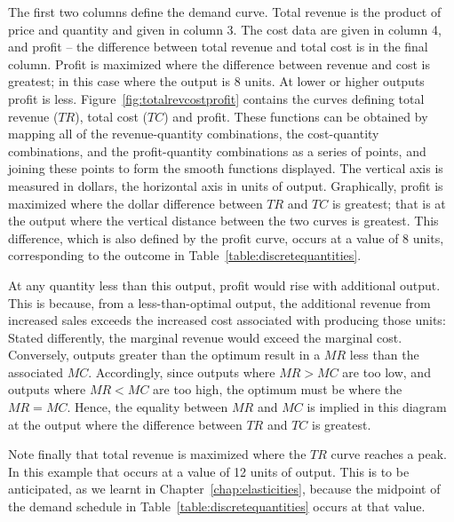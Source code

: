 The first two columns define the demand curve. Total revenue is the product
of price and quantity and given in column 3. The cost data are given in
column 4, and profit -- the difference between total revenue and total cost
is in the final column. Profit is maximized where the difference between
revenue and cost is greatest; in this case where the output is 8 units. At
lower or higher outputs profit is less. Figure~\ref{fig:totalrevcostprofit} contains the curves
defining total revenue ($TR$), total cost ($TC$) and profit. These functions
can be obtained by mapping all of the revenue-quantity combinations, the
cost-quantity combinations, and the profit-quantity combinations as a series of
points, and joining these points to form the smooth functions displayed. The
vertical axis is measured in dollars, the horizontal axis in units of
output. Graphically, profit is maximized where the dollar difference between 
$TR$ and $TC$ is greatest; that is at the output where the vertical distance
between the two curves is greatest. This difference, which is also defined
by the profit curve, occurs at a value of 8 units, corresponding to the
outcome in Table~\ref{table:discretequantities}.



\newhtmlpage

At any quantity less than this output, profit would rise with additional
output. This is because, from a less-than-optimal output, the additional
revenue from increased sales exceeds the increased cost associated with
producing those units: Stated differently, the marginal revenue would exceed
the marginal cost. Conversely, outputs greater than the optimum result in a 
$MR$ less than the associated $MC$. Accordingly, since outputs where $MR>MC$
are too low, and outputs where $MR<MC$ are too high, the optimum must be
where the $MR=MC$. Hence, the equality between $MR$ and $MC$ is implied in
this diagram at the output where the difference between $TR$ and $TC$ is
greatest.

Note finally that total revenue is maximized where the $TR$ curve reaches a
peak. In this example that occurs at a value of 12 units of output. This is
to be anticipated, as we learnt in Chapter~\ref{chap:elasticities}, because the midpoint of the
demand schedule in Table~\ref{table:discretequantities} occurs at that value.

\newhtmlpage



